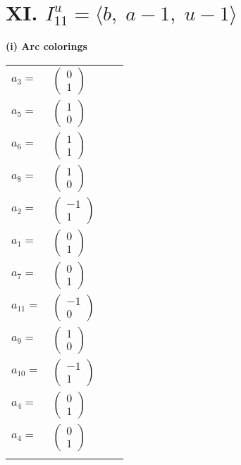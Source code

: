 \documentclass[1p]{elsarticle_modified}
\theoremstyle{definition}
\begin{document}
\centering \section*{XI. $I^u_{11}= \langle b,\;a-1,\;u-1 \rangle$}
\flushleft \textbf{(i) Arc colorings}\\
\begin{tabular}{m{7pt} m{180pt} m{7pt} m{180pt} }
\flushright $a_{3}=$&$\begin{pmatrix}0\\1\end{pmatrix}$ \\
\flushright $a_{5}=$&$\begin{pmatrix}1\\0\end{pmatrix}$ \\
\flushright $a_{6}=$&$\begin{pmatrix}1\\1\end{pmatrix}$ \\
\flushright $a_{8}=$&$\begin{pmatrix}1\\0\end{pmatrix}$ \\
\flushright $a_{2}=$&$\begin{pmatrix}-1\\1\end{pmatrix}$ \\
\flushright $a_{1}=$&$\begin{pmatrix}0\\1\end{pmatrix}$ \\
\flushright $a_{7}=$&$\begin{pmatrix}0\\1\end{pmatrix}$ \\
\flushright $a_{11}=$&$\begin{pmatrix}-1\\0\end{pmatrix}$ \\
\flushright $a_{9}=$&$\begin{pmatrix}1\\0\end{pmatrix}$ \\
\flushright $a_{10}=$&$\begin{pmatrix}-1\\1\end{pmatrix}$ \\
\flushright $a_{4}=$&$\begin{pmatrix}0\\1\end{pmatrix}$\\ \flushright $a_{4}=$&$\begin{pmatrix}0\\1\end{pmatrix}$\\&\end{tabular}
\end{document}
